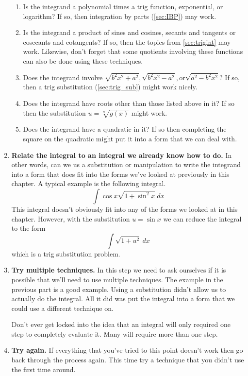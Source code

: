 \begin{enumerate}
\begin{enumerate}[label= \alph*.]
\item Is the integrand a polynomial times a trig function, exponential, or logarithm? If so, then integration by parts (\autoref{sec:IBP}) may work.

\item Is the integrand a product of sines and cosines, secants and tangents or cosecants and cotangents? If so, then the topics from \autoref{sec:trigint} may work. Likewise, don't forget that some quotients involving these functions can also be done using these techniques.

\item Does the integrand involve $\sqrt {b^2x^2 + a^2}, \sqrt {b^2x^2 - a^2}, \text{or} \sqrt { a^2-b^2x^2}$? If so, then a trig substitution (\autoref{sec:trig_sub}) might work nicely.

\item Does the integrand have roots other than those listed above in it? If so then the substitution $u=\sqrt[n]{g(x)}$ might work.

\item Does the integrand have a quadratic in it? If so then completing the square on the quadratic might put it into a form that we can deal with. 
\end{enumerate}

\item \textbf{Relate the integral to an integral we already know how to do.} In other words, can we us a substitution or manipulation to write the integrand into a  form that does fit into the forms we've looked at previously in this chapter. A typical example is the following integral.$$\int \cos x\sqrt{1 + \sin^2 x}\ dx$$
This integral doesn't obviously fit into any of the forms we looked at in this chapter. However, with the substitution $u = \sin x$ we can reduce the integral to the form $$\int \sqrt{1+u^2}\ dx$$ which is a trig substitution problem.

\item \textbf{Try multiple techniques.} In this step we need to ask ourselves if it is possible that we'll need to use multiple techniques. The example in the previous part is a good example. Using a substitution didn't allow us to actually do the integral. All it did was put the integral into a form that we could use a different technique on.

Don't ever get locked into the idea that an integral will only required one step to completely evaluate it. Many will require more than one step.

\item \textbf{Try again.} If everything that you've tried to this point doesn't work then go back through the process again. This time try a technique that you didn't use the first time around.
\end{enumerate}

